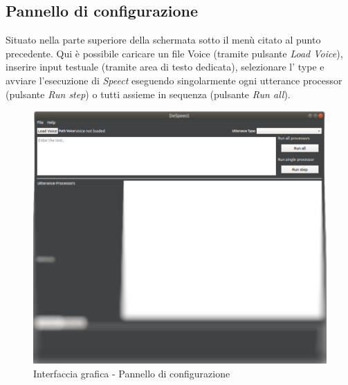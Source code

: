 \documentclass[openany,12pt,a4paper]{report}
\begin{document}
 	\subsection{Pannello di configurazione}
 	Situato nella parte superiore della schermata sotto il menù citato al punto precedente. Qui è possibile caricare un file Voice (tramite pulsante \textit{Load Voice}), inserire input testuale (tramite area di testo dedicata), selezionare l' type e avviare l'esecuzione di \textit{Speect} eseguendo singolarmente ogni utterance processor (pulsante \textit{Run step}) o tutti assieme in sequenza (pulsante \textit{Run all}).
 		\begin{figure}[H]
 			
 			\centering
 			
 			\includegraphics[width=\textwidth]{./img/config-panel}
 			
 			\caption{Interfaccia grafica - Pannello di configurazione}
 			
 		\end{figure}
	 	
\end{document}
